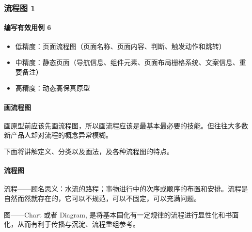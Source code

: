\documentclass[letterpaper,10pt,english]{sphinxmanual}
\begin{document}
\subsubsection{流程图 1\sphinxfootnotemark[580]}
\label{\detokenize{chapter_knowledge/flow_chart:id1}}\label{\detokenize{chapter_knowledge/flow_chart::doc}}%
\begin{footnotetext}[580]\sphinxAtStartFootnote
{}
%
\end{footnotetext}\ignorespaces 

\paragraph{编写有效用例 6\sphinxfootnotemark[581]}
\label{\detokenize{chapter_knowledge/flow_chart:id2}}%
\begin{footnotetext}[581]\sphinxAtStartFootnote
{}
%
\end{footnotetext}\ignorespaces \begin{itemize}
\item {} 
低精度：页面流程图（页面名称、页面内容、判断、触发动作和跳转）

\item {} 
中精度：静态页面（导航信息、组件元素、页面布局\sphinxhyphen{}栅格系统、文案信息、重要备注）

\item {} 
高精度：动态高保真原型

\end{itemize}


\paragraph{画流程图}
\label{\detokenize{chapter_knowledge/flow_chart:id3}}
画原型前应该先画流程图，所以画流程应该是最基本最必要的技能。但往往大多数新产品人却对流程的概念异常模糊。

下面将讲解定义、分类以及画法，及各种流程图的特点。


\paragraph{流程图}
\label{\detokenize{chapter_knowledge/flow_chart:id4}}
流程——顾名思义：水流的路程；事物进行中的次序或顺序的布置和安排。流程是自然而然就存在的，它可以不规范，可以不固定，可以充满问题。

图——Chart 或者 Diagram,
是将基本固化有一定规律的流程进行显性化和书面化，从而有利于传播与沉淀、流程重组参考。
\end{document}
